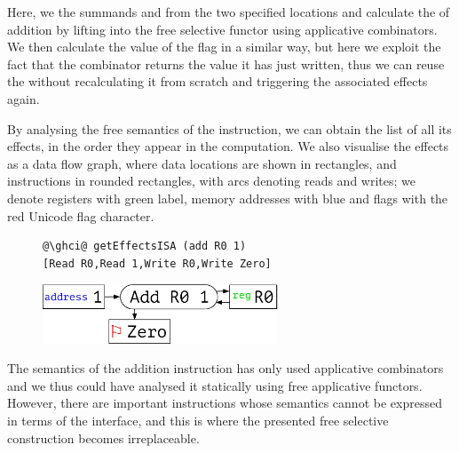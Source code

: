 \noindent
Here, we  the summands  and  from the two specified
locations and calculate the  of addition by lifting \hs{(+)} into the
free selective functor using applicative combinators. We then calculate the
value of the  flag in a similar way, but here we exploit the fact that
the  combinator returns the value it has just written, thus we can
reuse the  without recalculating it from scratch and triggering the
associated effects again.


By analysing the free semantics of the  instruction, we can obtain the
list of all its effects, in the order they appear in the computation. We also
visualise the effects as a data flow graph, where data locations are shown in
rectangles, and instructions in rounded rectangles, with arcs denoting reads
and writes; we denote registers with green  label, memory addresses
with blue  and flags with the red Unicode flag character.


\vspace{-1mm}
\begin{figure}[!h]
\begin{minipage}{0.45\textwidth}
\raggedleft
\begin{verbatim}
@\ghci@ getEffectsISA (add R0 1)
[Read R0,Read 1,Write R0,Write Zero]
\end{verbatim}
 \end{minipage}
 \begin{minipage}{0.45\textwidth}
  \centering
  \includegraphics[width=7cm]{./fig/add.pdf}
 \end{minipage}
\end{figure}
\vspace{-1mm}

The semantics of the addition instruction has only used applicative combinators
and we thus could have analysed it statically using free applicative functors.
However, there are important instructions whose semantics cannot be expressed
in terms of the  interface, and this is where the presented
free selective construction becomes irreplaceable.

